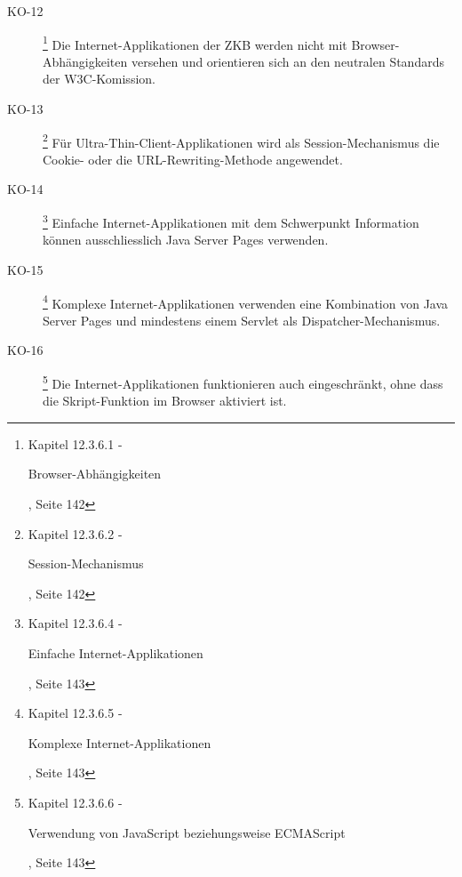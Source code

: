 \begin{description}
    \item[KO-12\label{itm:KO-12}]
    \footnote{\cite{ZkbHandbuchDerItArchitektur} Kapitel 12.3.6.1 -
    \begin{itshape}Browser-Abhängigkeiten\end{itshape}, Seite 142}
    Die Internet-Applikationen der ZKB werden nicht mit Browser-Abhängigkeiten
    versehen und orientieren sich an den neutralen Standards der W3C-Komission.
    
    \item[KO-13\label{itm:KO-13}]
    \footnote{\cite{ZkbHandbuchDerItArchitektur} Kapitel 12.3.6.2 -
    \begin{itshape}Session-Mechanismus\end{itshape}, Seite 142}
    Für Ultra-Thin-Client-Applikationen wird als Session-Mechanismus die
    Cookie- oder die URL-Rewriting-Methode angewendet.
    
    \item[KO-14\label{itm:KO-14}]
    \footnote{\cite{ZkbHandbuchDerItArchitektur} Kapitel 12.3.6.4 -
    \begin{itshape}Einfache Internet-Applikationen\end{itshape}, Seite 143}
    Einfache Internet-Applikationen mit dem Schwerpunkt Information können
    ausschliesslich Java Server Pages verwenden.
    
    \item[KO-15\label{itm:KO-15}]
    \footnote{\cite{ZkbHandbuchDerItArchitektur} Kapitel 12.3.6.5 -
    \begin{itshape}Komplexe Internet-Applikationen\end{itshape}, Seite 143}
    Komplexe Internet-Applikationen verwenden eine Kombination von Java Server
    Pages und mindestens einem Servlet als Dispatcher-Mechanismus.
    
    \item[KO-16\label{itm:KO-16}]
    \footnote{\cite{ZkbHandbuchDerItArchitektur} Kapitel 12.3.6.6 -
    \begin{itshape}Verwendung von JavaScript beziehungsweise
    ECMAScript\end{itshape}, Seite 143}
    Die Internet-Applikationen funktionieren auch eingeschränkt, ohne dass die
    Skript-Funktion im Browser aktiviert ist.
    

\end{description}
